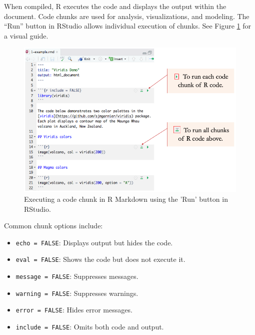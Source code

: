\documentclass[
]{book}
\newcommand{\passthrough}[1]{#1}
\providecommand{\tightlist}{%
  \setlength{\itemsep}{0pt}\setlength{\parskip}{0pt}}
\theoremstyle{definition}
\theoremstyle{definition}
\theoremstyle{definition}
\theoremstyle{definition}
\theoremstyle{remark}
\begin{document}
When compiled, R executes the code and displays the output within the document. Code chunks are used for analysis, visualizations, and modeling. The ``Run'' button in RStudio allows individual execution of chunks. See Figure \ref{fig:run-chunk} for a visual guide.

\begin{figure}

{\centering \includegraphics[width=0.9\linewidth]{images/run-chunk} 

}

\caption{Executing a code chunk in R Markdown using the 'Run' button in RStudio.}\label{fig:run-chunk}
\end{figure}

Common chunk options include:

\begin{itemize}
\tightlist
\item
  \passthrough{\lstinline!echo = FALSE!}: Displays output but hides the code.\\
\item
  \passthrough{\lstinline!eval = FALSE!}: Shows the code but does not execute it.\\
\item
  \passthrough{\lstinline!message = FALSE!}: Suppresses messages.\\
\item
  \passthrough{\lstinline!warning = FALSE!}: Suppresses warnings.\\
\item
  \passthrough{\lstinline!error = FALSE!}: Hides error messages.\\
\item
  \passthrough{\lstinline!include = FALSE!}: Omits both code and output.
\end{itemize}
\end{document}
